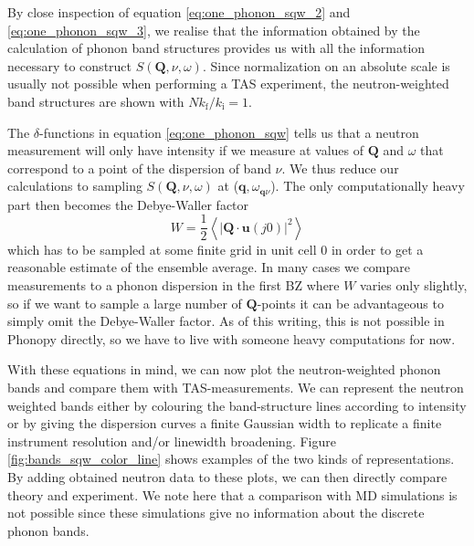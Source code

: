 By close inspection of equation \eqref{eq:one_phonon_sqw_2} and \eqref{eq:one_phonon_sqw_3}, we realise that the information obtained by the calculation of phonon band structures provides us with all the information necessary to construct $S(\bm{Q},\nu,\omega)$. Since normalization on an absolute scale is usually not possible when performing a TAS experiment, the neutron-weighted band structures are shown with $N k_\text{f} / k_\text{i} = 1$.

The $\delta$-functions in equation \eqref{eq:one_phonon_sqw} tells us that a neutron measurement will only have intensity if we measure at values of $\bm{Q}$ and $\omega$ that correspond to a point of the dispersion of band $\nu$. We thus reduce our calculations to sampling $S(\bm{Q},\nu,\omega)$ at ($\bm{q},\omega_{\bm{q}\nu}$). The only computationally heavy part then becomes the Debye-Waller factor
%
\[ W = \frac{1}{2} \left\langle | \bm{Q} \cdot \bm{u}(j0) |^2 \right\rangle \]
%
which has to be sampled at some finite grid in unit cell 0 in order to get a reasonable estimate of the ensemble average. In many cases we compare measurements to a phonon dispersion in the first BZ where $W$ varies only slightly, so if we want to sample a large number of $\bm{Q}$-points it can be advantageous to simply omit the Debye-Waller factor. As of this writing, this is not possible in Phonopy directly, so we have to live with someone heavy computations for now.

With these equations in mind, we can now plot the neutron-weighted phonon bands and compare them with TAS-measurements. We can represent the neutron weighted bands either by colouring the band-structure lines according to intensity or by giving the dispersion curves a finite Gaussian width to replicate a finite instrument resolution and/or linewidth broadening. Figure \ref{fig:bands_sqw_color_line} shows examples of the two kinds of representations. By adding obtained neutron data to these plots, we can then directly compare theory and experiment. We note here that a comparison with MD simulations is not possible since these simulations give no information about the discrete phonon bands.

